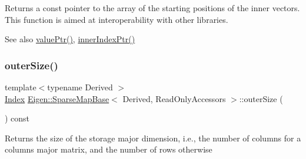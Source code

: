 \begin{DoxyReturn}{Returns}
a const pointer to the array of the starting positions of the inner vectors. This function is aimed at interoperability with other libraries. 
\end{DoxyReturn}
\begin{DoxySeeAlso}{See also}
\mbox{\hyperlink{class_eigen_1_1_sparse_compressed_base_a0f12f72d14b6c277d09be9f5ce2eab95}{value\+Ptr()}}, \mbox{\hyperlink{class_eigen_1_1_sparse_compressed_base_a197111c1289644f1ea38fe683ccdd82a}{inner\+Index\+Ptr()}} 
\end{DoxySeeAlso}
\mbox{\label{class_eigen_1_1_sparse_map_base_3_01_derived_00_01_read_only_accessors_01_4_a3d6ede19db6d42074ae063bc876231b1}} 
\subsubsection{\texorpdfstring{outerSize()}{outerSize()}}
{\footnotesize\ttfamily template$<$typename Derived $>$ \\
\mbox{\hyperlink{struct_eigen_1_1_eigen_base_a554f30542cc2316add4b1ea0a492ff02}{Index}} \mbox{\hyperlink{class_eigen_1_1_sparse_map_base}{Eigen\+::\+Sparse\+Map\+Base}}$<$ Derived, Read\+Only\+Accessors $>$\+::outer\+Size (\begin{DoxyParamCaption}{ }\end{DoxyParamCaption}) const\hspace{0.3cm}{\ttfamily [inline]}}





\begin{DoxyReturn}{Returns}
the size of the storage major dimension, i.\+e., the number of columns for a columns major matrix, and the number of rows otherwise 
\end{DoxyReturn}
\mbox{\label{class_eigen_1_1_sparse_map_base_3_01_derived_00_01_read_only_accessors_01_4_a3cdd6cab0abd7ac01925a695fc315d34}} 
